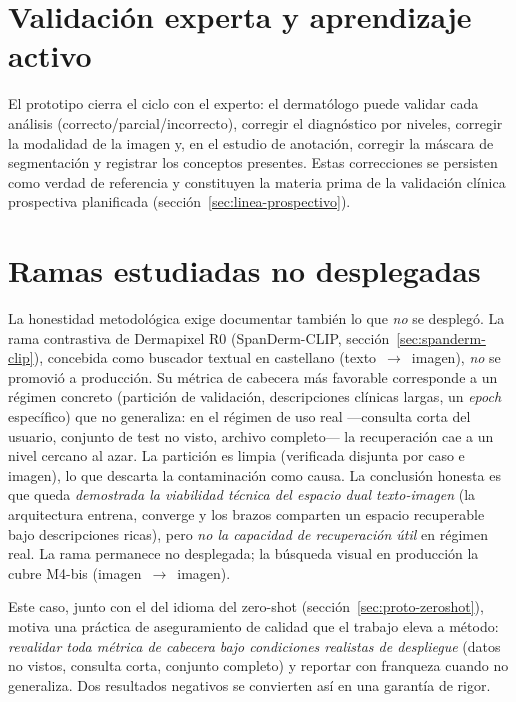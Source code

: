 \section{Validación experta y aprendizaje activo}
\label{sec:proto-anotacion}

El prototipo cierra el ciclo con el experto: el dermatólogo puede validar
cada análisis (correcto/parcial/incorrecto), corregir el diagnóstico por
niveles, corregir la modalidad de la imagen y, en el estudio de anotación,
corregir la máscara de segmentación y registrar los conceptos presentes.
Estas correcciones se persisten como verdad de referencia y constituyen la
materia prima de la validación clínica prospectiva planificada
(sección~\ref{sec:linea-prospectivo}).

\section{Ramas estudiadas no desplegadas}
\label{sec:proto-noproducto}

La honestidad metodológica exige documentar también lo que \emph{no} se
desplegó. La rama contrastiva de Dermapixel R0 (SpanDerm-CLIP,
sección~\ref{sec:spanderm-clip}), concebida como buscador textual en
castellano (texto~$\to$~imagen), \emph{no} se promovió a producción. Su
métrica de cabecera más favorable corresponde a un régimen concreto
(partición de validación, descripciones clínicas largas, un \emph{epoch}
específico) que no generaliza: en el régimen de uso real ---consulta corta
del usuario, conjunto de test no visto, archivo completo--- la recuperación
cae a un nivel cercano al azar. La partición es limpia (verificada
disjunta por caso e imagen), lo que descarta la contaminación como causa.
La conclusión honesta es que queda \emph{demostrada la viabilidad técnica
del espacio dual texto-imagen} (la arquitectura entrena, converge y los
brazos comparten un espacio recuperable bajo descripciones ricas), pero
\emph{no la capacidad de recuperación útil} en régimen real. La rama
permanece no desplegada; la búsqueda visual en producción la cubre M4-bis
(imagen~$\to$~imagen).

Este caso, junto con el del idioma del zero-shot
(sección~\ref{sec:proto-zeroshot}), motiva una práctica de aseguramiento
de calidad que el trabajo eleva a método: \emph{revalidar toda métrica de
cabecera bajo condiciones realistas de despliegue} (datos no vistos,
consulta corta, conjunto completo) y reportar con franqueza cuando no
generaliza. Dos resultados negativos se convierten así en una garantía de
rigor.

